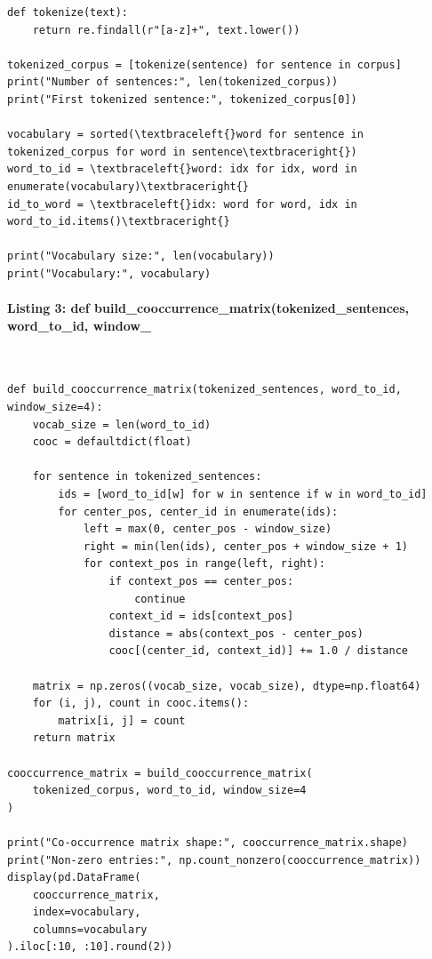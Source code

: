 \documentclass[12pt,a4paper,oneside]{report}
\begin{document}
\begin{Verbatim}[commandchars=\\\{\},breaklines=true,breakanywhere=true,fontsize=\scriptsize,frame=leftline,framesep=2mm,rulecolor=\color{gray}]
def tokenize(text):
    return re.findall(r"[a-z]+", text.lower())

tokenized_corpus = [tokenize(sentence) for sentence in corpus]
print("Number of sentences:", len(tokenized_corpus))
print("First tokenized sentence:", tokenized_corpus[0])

vocabulary = sorted(\textbraceleft{}word for sentence in tokenized_corpus for word in sentence\textbraceright{})
word_to_id = \textbraceleft{}word: idx for idx, word in enumerate(vocabulary)\textbraceright{}
id_to_word = \textbraceleft{}idx: word for word, idx in word_to_id.items()\textbraceright{}

print("Vocabulary size:", len(vocabulary))
print("Vocabulary:", vocabulary)
\end{Verbatim}
\paragraph{Listing 3: def build\_cooccurrence\_matrix(tokenized\_sentences, word\_to\_id, window\_}\mbox{}\\[-1ex]
\begin{Verbatim}[commandchars=\\\{\},breaklines=true,breakanywhere=true,fontsize=\scriptsize,frame=leftline,framesep=2mm,rulecolor=\color{gray}]
def build_cooccurrence_matrix(tokenized_sentences, word_to_id, window_size=4):
    vocab_size = len(word_to_id)
    cooc = defaultdict(float)

    for sentence in tokenized_sentences:
        ids = [word_to_id[w] for w in sentence if w in word_to_id]
        for center_pos, center_id in enumerate(ids):
            left = max(0, center_pos - window_size)
            right = min(len(ids), center_pos + window_size + 1)
            for context_pos in range(left, right):
                if context_pos == center_pos:
                    continue
                context_id = ids[context_pos]
                distance = abs(context_pos - center_pos)
                cooc[(center_id, context_id)] += 1.0 / distance

    matrix = np.zeros((vocab_size, vocab_size), dtype=np.float64)
    for (i, j), count in cooc.items():
        matrix[i, j] = count
    return matrix

cooccurrence_matrix = build_cooccurrence_matrix(
    tokenized_corpus, word_to_id, window_size=4
)

print("Co-occurrence matrix shape:", cooccurrence_matrix.shape)
print("Non-zero entries:", np.count_nonzero(cooccurrence_matrix))
display(pd.DataFrame(
    cooccurrence_matrix,
    index=vocabulary,
    columns=vocabulary
).iloc[:10, :10].round(2))
\end{Verbatim}
\end{document}

